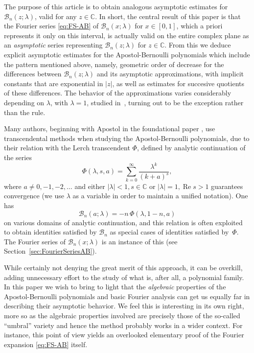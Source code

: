 \documentclass[11pt,a4paper]{amsart}
\newcommand{\C}{\mathbb{C}}
\newcommand{\B}{\mathcal{B}}
\renewcommand{\Re}{\operatorname{Re}}
\theoremstyle{plain}
\theoremstyle{remark}
\begin{document}
The purpose of this article is to obtain analogous asymptotic estimates for 
$\B_n(z;\lambda)$, valid for any $z \in \C$. In short, the central result of this paper is that the Fourier series
\eqref{eq:FS-AB} of $\B_{n}(x;\lambda)$ for $x \in [0,1]$, which a priori represents it only on this interval, is actually valid on the entire complex plane as an \emph{asymptotic} series representing $\B_{n}(z;\lambda)$ for $z \in \C$. From this we deduce explicit asymptotic estimates for the Apostol-Bernoulli polynomials which include the pattern mentioned above, namely, geometric order of decrease for the differences between $\B_{n}(z;\lambda)$ and its asymptotic approximations, with implicit constants that are exponential in $|z|$, as well as estimates for succesive quotients of these differences. The behavior of the approximations varies considerably depending on $\lambda$, with $\lambda = 1$, studied in~\cite{NRV-JAT}, turning out to be the exception rather than the rule.

Many authors, beginning with Apostol in the foundational paper \cite{Ap}, use transcendental methods when studying the Apostol-Bernoulli polynomials, due to their relation with the Lerch transcendent $\Phi$, defined by analytic continuation of the series
$$
	\Phi(\lambda,s,a) = \sum_{k=0}^{\infty} \frac{\lambda^{k}}{(k + a)^{s}},
$$
where $a \neq 0,-1,-2,\ldots$ and either $|\lambda| < 1, s \in \C$ or $|\lambda|=1, \Re s > 1$
guarantees convergence (we use $\lambda$ as a variable in order to maintain a unified notation).
One has 
%
\begin{equation}
\label{eq:AB-Phi}
	\B_{n}(a;\lambda) = -n \, \Phi(\lambda,1-n,a)
\end{equation}
%
on various domains of analytic continuation, and this relation is often exploited to obtain identities satisfied by $\B_{n}$ as special cases of identities satisfied by~$\Phi$. The Fourier series of $\B_{n}(x;\lambda)$ is an instance of this (see Section~\ref{sec:FourierSeriesAB}).

While certainly not denying the great merit of this approach, it can be overkill, adding unnecessary effort to the study of what is, after all, a polynomial family. 
In this paper we wish to bring to light that the \emph{algebraic} properties of the Apostol-Bernoulli polynomials and basic Fourier analysis can get us equally far in describing their asymptotic behavior.
We feel this is interesting in its own right, more so as the algebraic properties involved are precisely those of the so-called ``umbral'' variety and hence the method probably works in a wider context. For instance, this point of view yields an overlooked elementary proof of the Fourier expansion \eqref{eq:FS-AB} itself.
\end{document}
